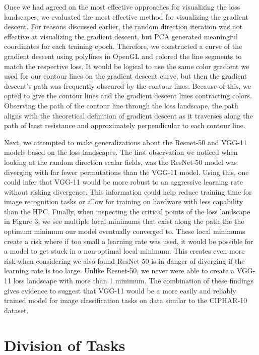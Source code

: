 \documentclass{acmsiggraph}
\begin{document}
Once we had agreed on the most effective approaches for visualizing the loss landscapes, we evaluated the most effective method for visualizing the gradient descent. For reasons discussed earlier, the random direction iteration was not effective at visualizing the gradient descent, but PCA generated meaningful coordinates for each training epoch. Therefore, we constructed a curve of the gradient descent using polylines in OpenGL and colored the line segments to match the respective loss. It would be logical to use the same color gradient we used for our contour lines on the gradient descent curve, but then the gradient descent's path was frequently obscured by the contour lines. Because of this, we opted to give the contour lines and the gradient descent lines contracting colors. Observing the path of the contour line through the loss landscape, the path aligns with the theoretical definition of gradient descent as it traverses along the path of least resistance and approximately perpendicular to each contour line.

Next, we attempted to make generalizations about the Resnet-50 and VGG-11 models based on the loss landscapes. The first observation we noticed when looking at the random direction scalar fields, was the ResNet-50 model was diverging with far fewer permutations than the VGG-11 model. Using this, one could infer that VGG-11 would be more robust to an aggressive learning rate without risking divergence. This information could help reduce training time for image recognition tasks or allow for training on hardware with less capability than the HPC. Finally, when inspecting the critical points of the loss landscape in Figure 3, we see multiple local minimums that exist along the path the the optimum minimum our model eventually converged to. These local minimums create a risk where if too small a learning rate was used, it would be possible for a model to get stuck in a non-optimal local minimum. This creates even more risk when considering we also found ResNet-50 is in danger of diverging if the learning rate is too large. Unlike Resnet-50, we never were able to create a VGG-11 loss landscape with more than 1 minimum. The combination of these findings gives evidence to suggest that VGG-11 would be a more easily and reliably trained model for image classification tasks on data similar to the CIPHAR-10 dataset.

\section{Division of Tasks}
\label{sec:intro}
\end{document}
